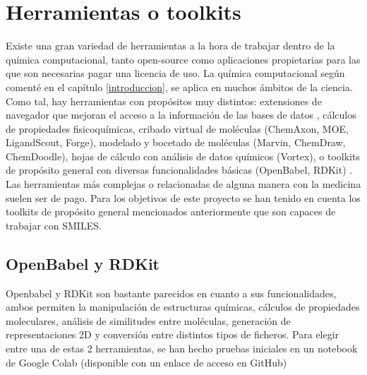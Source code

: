 \section{Herramientas o toolkits} \label{toolkits}

Existe una gran variedad de herramientas a la hora de trabajar dentro de la química computacional, tanto open-source como aplicaciones propietarias para las que son necesarias pagar una licencia de uso. La química computacional según comenté en el capítulo \ref{introduccion}, se aplica en muchos ámbitos de la ciencia. Como tal, hay herramientas con propósitos muy distintos: extensiones de navegador que mejoran el acceso a la información de las bases de datos \cite{safari_extensions}, cálculos de propiedades fisicoquímicas, cribado virtual de moléculas (ChemAxon, MOE, LigandScout, Forge), modelado y bocetado de moléculas (Marvin, ChemDraw, ChemDoodle), hojas de cálculo con análisis de datos químicos (Vortex), o toolkits de propósito general con diversas funcionalidades básicas (OpenBabel, RDKit)
\cite{toolkits_recap}. Las herramientas más complejas o relacionadas de alguna manera con la medicina suelen ser de pago. Para los objetivos de este proyecto se han tenido en cuenta los toolkits de propósito general mencionados anteriormente que son capaces de trabajar con SMILES.

\subsection{OpenBabel y RDKit}

Openbabel y RDKit son bastante parecidos en cuanto a sus funcionalidades, ambos permiten la manipulación de estructuras químicas, cálculos de propiedades moleculares, análisis de similitudes entre moléculas, generación de representaciones 2D y conversión entre distintos tipos de ficheros. Para elegir entre una de estas 2 herramientas, se han hecho pruebas iniciales en un notebook de Google Colab (disponible con un enlace de acceso en GitHub)


